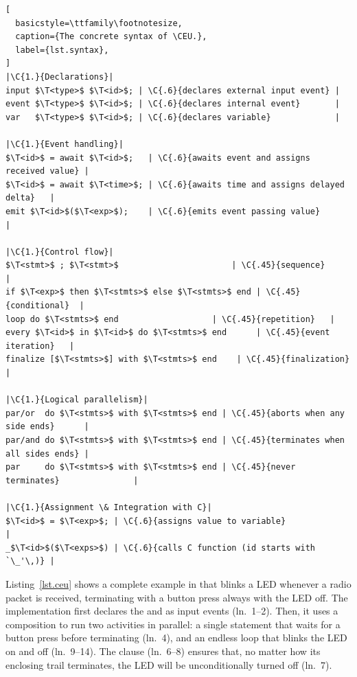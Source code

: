 \bgroup
\def\T<#1>{\langle\mathit{#1}\rangle}
\def\C#1#2{\hfill\rmfamily\itshape\makebox[#1\columnwidth][l]{//~#2}}
\begin{lstlisting}[
  basicstyle=\ttfamily\footnotesize,
  caption={The concrete syntax of \CEU.},
  label={lst.syntax},
]
|\C{1.}{Declarations}|
input $\T<type>$ $\T<id>$; | \C{.6}{declares external input event} |
event $\T<type>$ $\T<id>$; | \C{.6}{declares internal event}       |
var   $\T<type>$ $\T<id>$; | \C{.6}{declares variable}             |

|\C{1.}{Event handling}|
$\T<id>$ = await $\T<id>$;   | \C{.6}{awaits event and assigns received value} |
$\T<id>$ = await $\T<time>$; | \C{.6}{awaits time and assigns delayed delta}   |
emit $\T<id>$($\T<exp>$);    | \C{.6}{emits event passing value}               |

|\C{1.}{Control flow}|
$\T<stmt>$ ; $\T<stmt>$                       | \C{.45}{sequence}     |
if $\T<exp>$ then $\T<stmts>$ else $\T<stmts>$ end | \C{.45}{conditional}  |
loop do $\T<stmts>$ end                   | \C{.45}{repetition}   |
every $\T<id>$ in $\T<id>$ do $\T<stmts>$ end      | \C{.45}{event iteration}   |
finalize [$\T<stmts>$] with $\T<stmts>$ end    | \C{.45}{finalization} |

|\C{1.}{Logical parallelism}|
par/or  do $\T<stmts>$ with $\T<stmts>$ end | \C{.45}{aborts when any side ends}      |
par/and do $\T<stmts>$ with $\T<stmts>$ end | \C{.45}{terminates when all sides ends} |
par     do $\T<stmts>$ with $\T<stmts>$ end | \C{.45}{never terminates}               |

|\C{1.}{Assignment \& Integration with C}|
$\T<id>$ = $\T<exp>$; | \C{.6}{assigns value to variable}                |
_$\T<id>$($\T<exps>$) | \C{.6}{calls C function (id starts with `\_'\,)} |
\end{lstlisting}
\egroup

Listing~\ref{lst.ceu} shows a complete example in \CEU that blinks a LED
whenever a radio packet is received, terminating with a button press always
with the LED off.
%
The implementation first declares the  and  as
input events (ln.~1--2).
Then, it uses a  composition to run two activities in parallel:
a single statement that waits for a button press before terminating (ln.~4),
and an endless loop that blinks the LED on and off (ln.~9--14).
The  clause (ln.~6--8) ensures that, no matter how its enclosing
trail terminates, the LED will be unconditionally turned off (ln.~7).

